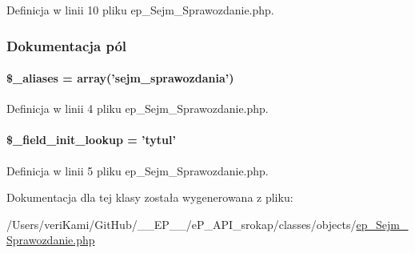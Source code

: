 Definicja w linii 10 pliku ep\-\_\-\-Sejm\-\_\-\-Sprawozdanie.\-php.



\subsubsection{Dokumentacja pól}
\hypertarget{classep___sejm___sprawozdanie_ab4e31d75f0bc5d512456911e5d01366b}{
\paragraph[{\$\-\_\-aliases}]{\setlength{\rightskip}{0pt plus 5cm}\$\-\_\-aliases = array('sejm\-\_\-sprawozdania')}}\label{classep___sejm___sprawozdanie_ab4e31d75f0bc5d512456911e5d01366b}


Definicja w linii 4 pliku ep\-\_\-\-Sejm\-\_\-\-Sprawozdanie.\-php.

\hypertarget{classep___sejm___sprawozdanie_a4a4d54ae35428077a7c61ec8a5139af3}{
\paragraph[{\$\-\_\-field\-\_\-init\-\_\-lookup}]{\setlength{\rightskip}{0pt plus 5cm}\$\-\_\-field\-\_\-init\-\_\-lookup = 'tytul'}}\label{classep___sejm___sprawozdanie_a4a4d54ae35428077a7c61ec8a5139af3}


Definicja w linii 5 pliku ep\-\_\-\-Sejm\-\_\-\-Sprawozdanie.\-php.



Dokumentacja dla tej klasy została wygenerowana z pliku\-:\begin{DoxyCompactItemize}
\item 
/\-Users/veri\-Kami/\-Git\-Hub/\-\_\-\-\_\-\-E\-P\-\_\-\-\_\-/e\-P\-\_\-\-A\-P\-I\-\_\-srokap/classes/objects/\hyperlink{ep___sejm___sprawozdanie_8php}{ep\-\_\-\-Sejm\-\_\-\-Sprawozdanie.\-php}\end{DoxyCompactItemize}
